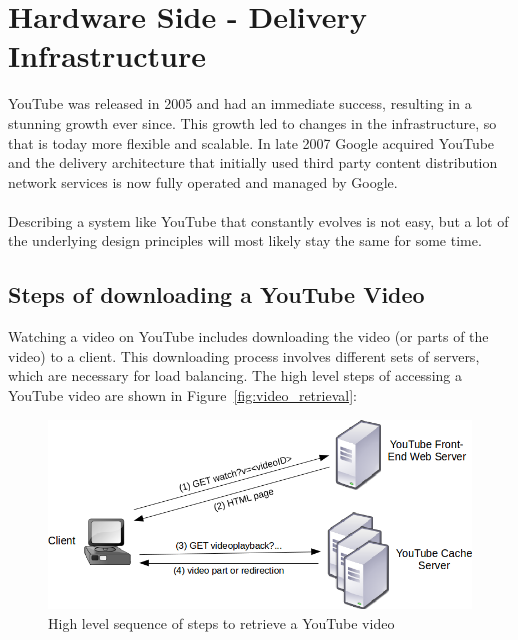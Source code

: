 \section{Hardware Side - Delivery Infrastructure}
\label{chp:hardware_side}

YouTube was released in 2005 and had an immediate success, resulting in a stunning growth ever since. This growth led to changes in the infrastructure, so that is today more flexible and scalable. In late 2007 Google acquired YouTube and the delivery architecture that initially used third party content distribution network services is now fully operated and managed by Google.
\\
\\
Describing a system like YouTube that constantly evolves is not easy, but a lot of the underlying design principles will most likely stay the same for some time.

\subsection{Steps of downloading a YouTube Video}

Watching a video on YouTube includes downloading the video (or parts of the video) to a client. This downloading process involves different sets of servers, which are necessary for load balancing. The high level steps of accessing a YouTube video are shown in Figure~\vref{fig:video_retrieval}:

\begin{figure}[htbp]
  \begin{center}
    \includegraphics[width=\textwidth]{pictures/video_retrieval.png}
    \caption{High level sequence of steps to retrieve a YouTube video}
    \label{fig:video_retrieval}
  \end{center}
\end{figure}

